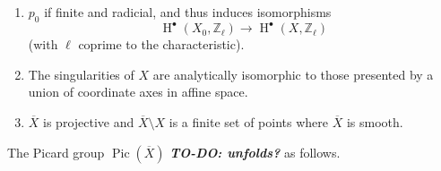     
 \begin{enumerate}
      
 \item[(a)]
        \(p_0\) if finite and radicial, and thus induces isomorphisms
        \[           \operatorname {H}^\bullet (X_0,\mathbb {Z}_\ell )           \to  \operatorname {H}^\bullet (X,\mathbb {Z}_\ell )         \]
        (with \(\ell \) coprime to the characteristic).
      

      
 \item[(b)]
        The singularities of \(X\) are analytically isomorphic to those presented by a union of coordinate axes in affine space.
      

      
 \item[(c)]
        \(\overline {X}\) is projective and \(\overline {X}\setminus {X}\) is a finite set of points where \(\overline {X}\) is smooth.
      

    \end{enumerate}\label{hodge-theory-iii-10.3.2}\par{}The Picard group \(\operatorname {Pic}(\overline {X})\) \textbf{\emph{TO-DO: unfolds?}} as follows.

